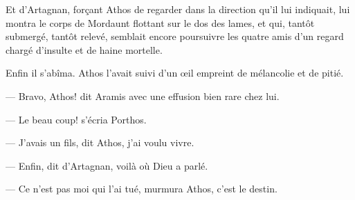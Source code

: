 Et d'Artagnan, forçant Athos de regarder dans la direction qu'il lui indiquait, lui montra le corps de Mordaunt flottant sur le dos des lames, et qui, tantôt submergé, tantôt relevé, semblait encore poursuivre les quatre amis d'un regard chargé d'insulte et de haine mortelle.

Enfin il s'abîma. Athos l'avait suivi d'un œil empreint de mélancolie et de pitié.

— Bravo, Athos! dit Aramis avec une effusion bien rare chez lui.

— Le beau coup! s'écria Porthos.

— J'avais un fils, dit Athos, j'ai voulu vivre.

— Enfin, dit d'Artagnan, voilà où Dieu a parlé.

— Ce n'est pas moi qui l'ai tué, murmura Athos, c'est le destin.